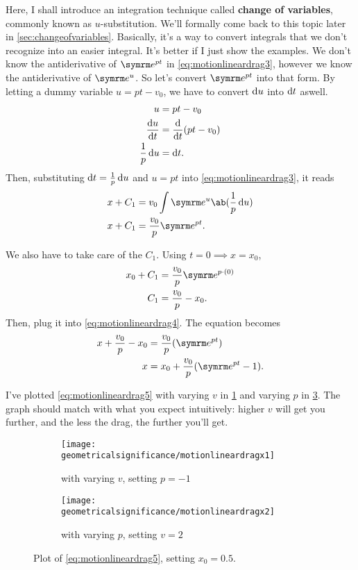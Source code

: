 Here, I shall introduce an integration technique called \textbf{change of variables}, commonly known as $u$-substitution. We'll formally come back to this topic later in \cref{sec:changeofvariables}. Basically, it's a way to convert integrals that we don't recognize into an easier integral. It's better if I just show the examples. We don't know the antiderivative of $\e^{pt}$ in \cref{eq:motionlineardrag3}, however we know the antiderivative of $\e^{u}$. So let's convert $\e^{pt}$ into that form. By letting a dummy variable $u = pt - v_0$, we have to convert $\odif{u}$ into $\odif{t}$ aswell.
\begin{align*}
    u &= pt - v_0 \\
	\odv{u}{t} &= \odv*{(pt - v_0)}{t} \\
    \frac{1}{p}\odif{u} &= \odif{t}.
\end{align*}
Then, substituting $\odif{t} = \frac{1}{p}\odif{u}$ and $u = pt$ into \cref{eq:motionlineardrag3}, it reads
\begin{align}
    x + C_1 &= v_0\int\e^{u}\ab(\frac{1}{p}\odif{u}) \nonumber\\
    x + C_1 &= \frac{v_0}{p}\e^{pt}. \label{eq:motionlineardrag4}
\end{align}

We also have to take care of the $C_1$. Using $t = 0 \implies x = x_0$,
\begin{align*}
    x_0 + C_1 &= \frac{v_0}{p}\e^{p\cdot(0)} \\
    C_1 &= \frac{v_0}{p} - x_0.
\end{align*}
Then, plug it into \cref{eq:motionlineardrag4}. The equation becomes
\begin{align}
    x + \frac{v_0}{p} - x_0 &= \frac{v_0}{p}(\e^{pt}) \nonumber\\
    x &= x_0 + \frac{v_0}{p}(\e^{pt} - 1). \label{eq:motionlineardrag5}
\end{align}

I've plotted \cref{eq:motionlineardrag5} with varying $v$ in \cref{fig:motionlineardragx1} and varying $p$ in \cref{fig:motionlineardragx2}. The graph should match with what you expect intuitively: higher $v$ will get you further, and the less the drag, the further you'll get.

\begin{figure}[ht]
    \centering
    \begin{subfigure}[l]{0.45\textwidth}
        \centering
        \texttt{[image: geometricalsignificance/motionlineardragx1]}
        \caption{with varying $v$, setting $p = -1$}
        \label{fig:motionlineardragx1}
    \end{subfigure}
    \begin{subfigure}[r]{0.45\textwidth}
        \centering
        \texttt{[image: geometricalsignificance/motionlineardragx2]}
        \caption{with varying $p$, setting $v = 2$}
        \label{fig:motionlineardragx2}
    \end{subfigure}
    \caption{Plot of \cref{eq:motionlineardrag5}, setting $x_0 = 0.5$.}
\end{figure}


